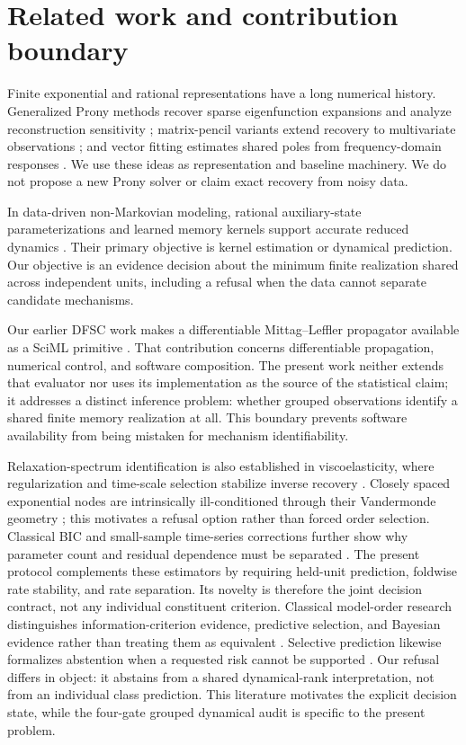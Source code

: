 \documentclass[11pt]{article}
\begin{document}
\section{Related work and contribution boundary}
Finite exponential and rational representations have a long numerical history. Generalized Prony methods recover sparse eigenfunction expansions and analyze reconstruction sensitivity \cite{stampfer2020gop}; matrix-pencil variants extend recovery to multivariate observations \cite{bosner2021parallel}; and vector fitting estimates shared poles from frequency-domain responses \cite{gustavsen1999vector}. We use these ideas as representation and baseline machinery. We do not propose a new Prony solver or claim exact recovery from noisy data.

In data-driven non-Markovian modeling, rational auxiliary-state parameterizations and learned memory kernels support accurate reduced dynamics \cite{lei2016parameterization,ge2024state,lang2026learning}. Their primary objective is kernel estimation or dynamical prediction. Our objective is an evidence decision about the minimum finite realization shared across independent units, including a refusal when the data cannot separate candidate mechanisms.

Our earlier DFSC work makes a differentiable Mittag--Leffler propagator available as a SciML primitive \cite{hu2026dfsc}. That contribution concerns differentiable propagation, numerical control, and software composition. The present work neither extends that evaluator nor uses its implementation as the source of the statistical claim; it addresses a distinct inference problem: whether grouped observations identify a shared finite memory realization at all. This boundary prevents software availability from being mistaken for mechanism identifiability.

Relaxation-spectrum identification is also established in viscoelasticity, where regularization and time-scale selection stabilize inverse recovery \cite{stankiewicz2023relaxation}. Closely spaced exponential nodes are intrinsically ill-conditioned through their Vandermonde geometry \cite{moitra2015superresolution}; this motivates a refusal option rather than forced order selection. Classical BIC and small-sample time-series corrections further show why parameter count and residual dependence must be separated \cite{schwarz1978bic,hurvich1989timeseries}. The present protocol complements these estimators by requiring held-unit prediction, foldwise rate stability, and rate separation. Its novelty is therefore the joint decision contract, not any individual constituent criterion.
Classical model-order research distinguishes information-criterion evidence, predictive selection, and Bayesian evidence rather than treating them as equivalent \cite{stoica2004modelorder,shao1993crossvalidation,kass1995bayes}. Selective prediction likewise formalizes abstention when a requested risk cannot be supported \cite{geifman2017selective}. Our refusal differs in object: it abstains from a shared dynamical-rank interpretation, not from an individual class prediction. This literature motivates the explicit decision state, while the four-gate grouped dynamical audit is specific to the present problem.
\end{document}
